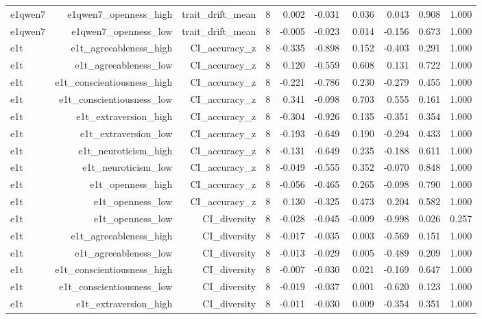 \documentclass[11pt]{article}
\begin{document}
\begin{landscape}
\begin{longtable}{@{}lrrrrrrrrr@{}}
e1qwen7 & e1qwen7\_openness\_high & trait\_drift\_mean & 8 & 0.002 & -0.031 & 0.036 & 0.043 & 0.908 & 1.000 \\
e1qwen7 & e1qwen7\_openness\_low & trait\_drift\_mean & 8 & -0.005 & -0.023 & 0.014 & -0.156 & 0.673 & 1.000 \\
e1t & e1t\_agreeableness\_high & CI\_accuracy\_z & 8 & -0.335 & -0.898 & 0.152 & -0.403 & 0.291 & 1.000 \\
e1t & e1t\_agreeableness\_low & CI\_accuracy\_z & 8 & 0.120 & -0.559 & 0.608 & 0.131 & 0.722 & 1.000 \\
e1t & e1t\_conscientiousness\_high & CI\_accuracy\_z & 8 & -0.221 & -0.786 & 0.230 & -0.279 & 0.455 & 1.000 \\
e1t & e1t\_conscientiousness\_low & CI\_accuracy\_z & 8 & 0.341 & -0.098 & 0.703 & 0.555 & 0.161 & 1.000 \\
e1t & e1t\_extraversion\_high & CI\_accuracy\_z & 8 & -0.304 & -0.926 & 0.135 & -0.351 & 0.354 & 1.000 \\
e1t & e1t\_extraversion\_low & CI\_accuracy\_z & 8 & -0.193 & -0.649 & 0.190 & -0.294 & 0.433 & 1.000 \\
e1t & e1t\_neuroticism\_high & CI\_accuracy\_z & 8 & -0.131 & -0.649 & 0.235 & -0.188 & 0.611 & 1.000 \\
e1t & e1t\_neuroticism\_low & CI\_accuracy\_z & 8 & -0.049 & -0.555 & 0.352 & -0.070 & 0.848 & 1.000 \\
e1t & e1t\_openness\_high & CI\_accuracy\_z & 8 & -0.056 & -0.465 & 0.265 & -0.098 & 0.790 & 1.000 \\
e1t & e1t\_openness\_low & CI\_accuracy\_z & 8 & 0.130 & -0.325 & 0.473 & 0.204 & 0.582 & 1.000 \\
e1t & e1t\_openness\_low & CI\_diversity & 8 & -0.028 & -0.045 & -0.009 & -0.998 & 0.026 & 0.257 \\
e1t & e1t\_agreeableness\_high & CI\_diversity & 8 & -0.017 & -0.035 & 0.003 & -0.569 & 0.151 & 1.000 \\
e1t & e1t\_agreeableness\_low & CI\_diversity & 8 & -0.013 & -0.029 & 0.005 & -0.489 & 0.209 & 1.000 \\
e1t & e1t\_conscientiousness\_high & CI\_diversity & 8 & -0.007 & -0.030 & 0.021 & -0.169 & 0.647 & 1.000 \\
e1t & e1t\_conscientiousness\_low & CI\_diversity & 8 & -0.019 & -0.037 & 0.001 & -0.620 & 0.123 & 1.000 \\
e1t & e1t\_extraversion\_high & CI\_diversity & 8 & -0.011 & -0.030 & 0.009 & -0.354 & 0.351 & 1.000 \\

\end{longtable}
\end{landscape}
\end{document}
